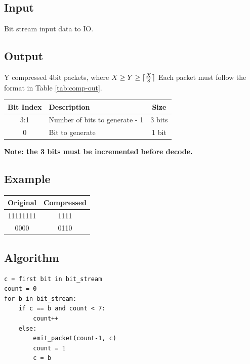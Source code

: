 \documentclass[12pt]{report}
\DeclarePairedDelimiter\ceil{\lceil}{\rceil}
\begin{document}
\subsection{Input}
Bit stream input data to IO.

\subsection{Output}
Y compressed 4bit packets, where $X \geq Y \geq \ceil{\frac{X}{8}}$
Each packet must follow the format in Table \ref{tab:comp-out}.

\begin{center}
 \begin{tabular}{||c |l |c||} 
 \hline
 Bit Index & Description & Size \\ [0.5ex] 
 \hline\hline
  3:1 & Number of bits to generate - 1 & 3 bits  \\ 
 \hline
 0  & Bit to generate &  1 bit \\ [1ex] 
 \hline
\end{tabular}
\end{center}

\textbf{Note: the 3 bits must be incremented before decode.}

\subsection{Example}

\begin{center}
 \begin{tabular}{||c |c||} 
 \hline
 Original & Compressed \\ [0.5ex] 
 \hline\hline
  11111111 & 1111 \\ 
 \hline
 0000  & 0110 \\ [1ex] 
 \hline
\end{tabular}
\end{center}

\subsection{Algorithm}
\begin{verbatim}
c = first bit in bit_stream
count = 0
for b in bit_stream:
    if c == b and count < 7:
        count++
    else:
        emit_packet(count-1, c)
        count = 1
        c = b
\end{verbatim}
\end{document}
